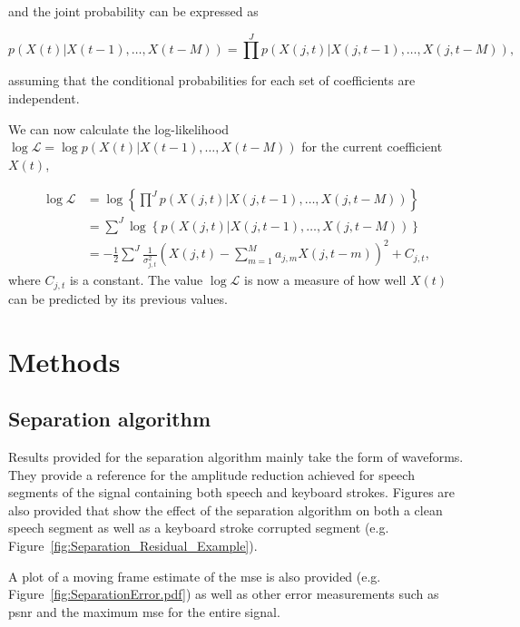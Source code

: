 and the joint probability can be expressed as

\begin{equation}\label{eq:marginal}
p\left(X(t)|X\left(t-1\right),\ldots,X\left(t-M\right)\right) = \prod^J p\left(X\left(j,t\right)|X\left(j,t-1\right),\ldots,X\left(j,t-M\right)\right),
\end{equation}

assuming that the conditional probabilities for each set of coefficients are independent.

We can now calculate the log-likelihood $\log\mathcal{L} = \log{p\left(X(t)|X\left(t-1\right),\ldots,X\left(t-M\right)\right)}$ for the current coefficient $X(t)$,

\begin{align}\label{eq:loglike}
\log \mathcal{L} &= \log \left\{ \prod^J p \left( X(j,t) | X(j,t-1),\ldots,X(j,t-M) \right) \right\} \\
&=  \sum^J \log \left\{p \left( X(j,t) | X(j,t-1),\ldots,X(j,t-M) \right) \right\}\nonumber\\
&=  -\frac{1}{2} \sum^J \frac{1}{\sigma_{j,t}^2}\left(X(j,t) -  \sum_{m=1}^{M} a_{j,m} X(j,t - m) \right)^2 + C_{j,t}\nonumber,
\end{align}
where $C_{j,t}$ is a constant. The value $\log \mathcal{L}$ is now a measure of how well $X(t)$ can be predicted by its previous values.

\section{Methods}\label{sec:WPmethods} %
\subsection{Separation algorithm}
Results provided for the separation algorithm mainly take the form of waveforms. They provide a reference for the amplitude reduction achieved for speech segments of the signal containing both speech and keyboard strokes. Figures are also provided that show the effect of the separation algorithm on both a clean speech segment as well as a keyboard stroke corrupted segment (e.g. Figure~\ref{fig:Separation_Residual_Example}).

A plot of a moving frame estimate of the \gls{mse} is also provided (e.g. Figure~\ref{fig:SeparationError.pdf}) as well as other error measurements such as \gls{psnr} and the maximum \gls{mse} for the entire signal.

